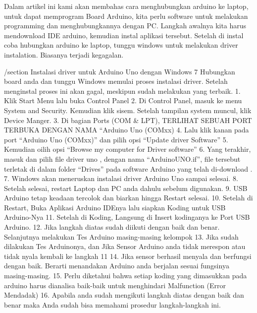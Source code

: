 
Dalam artikel ini kami akan membahas cara menghubungkan arduino ke laptop, untuk dapat memprogram Board Arduino, kita perlu software untuk melakukan programming dan menghubungkannya dengan PC. Langkah awalnya kita harus mendownload IDE arduino, kemudian instal aplikasi tersebut. Setelah di instal coba hubungkan arduino ke laptop, tunggu windows untuk melakukan driver instalation. Biasanya terjadi kegagalan.

/section
Instalasi driver untuk Arduino Uno dengan Windows 7
Hubungkan board anda dan tunggu Windows memulai proses instalasi driver. Setelah menginstal proses ini akan gagal, meskipun sudah melakukan yang terbaik.
1.	Klik Start Menu lalu buka Control Panel
2.	Di Control Panel, masuk ke menu System and Security. Kemudian klik sisem. Setelah tampilan system muncul, klik Device Manger.
3.	Di bagian Ports (COM & LPT), TERLIHAT SEBUAH PORT TERBUKA DENGAN NAMA “Arduino Uno (COMxx)
4.	Lalu klik kanan pada port “Arduino Uno (COMxx)” dan pilih opsi “Update driver Software”
5.	Kemudian oilih opsi “Browse my computer for Driver software”
6.	Yang terakhir, masuk dan pilih file driver uno , dengan nama “ArduinoUNO.if”, file tersebut terletak di dalam folder “Drives” pada software Arduino yang telah di-download .
7.	Windows akan meneruskan instalasi driver Arduino Uno sampai selesai.
8.  Setelah selesai, restart Laptop dan PC anda dahulu sebelum digunakan.
9.  USB Arduino tetap keadaan tercolok dan biarkan hingga Restart selesai.
10. Setelah di Restart, Buka Aplikasi Arduino IDEnya lalu siapkan Koding untuk USB Arduino-Nya
11. Setelah di Koding, Langsung di Insert kodinganya ke Port USB Arduino.
12. Jika langkah diatas sudah diikuti dengan baik dan benar. Selanjutnya melakukan Tes Arduino masing-masing kelompok
13. Jika sudah dilakukan Tes Arduinonya, dan Jika Sensor Arduino anda tidak merespon atau tidak nyala kembali ke langkah 11
14. Jika sensor berhasil menyala dan berfungsi dengan baik. Berarti menandakan Arduino anda berjalan sesuai fungsinya masing-masing.
15. Perlu diketahui bahwa setiap koding yang dimasukkan pada arduino harus dianalisa baik-baik untuk menghindari Malfunction (Error Mendadak)
16. Apabila anda sudah mengikuti langkah diatas dengan baik dan benar maka Anda sudah bisa memahami prosedur langkah-langkah ini.
